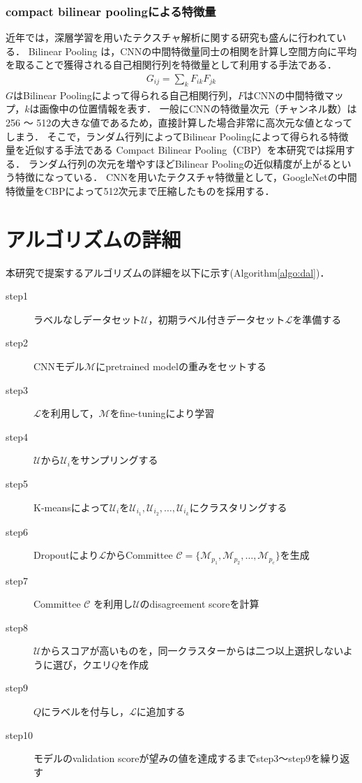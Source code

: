 \subsubsection{compact bilinear poolingによる特徴量}
近年では，深層学習を用いたテクスチャ解析に関する研究も盛んに行われている．
Bilinear Pooling \cite{lin2015bilinear}は，CNNの中間特徴量同士の相関を計算し空間方向に平均を取ることで獲得される自己相関行列を特徴量として利用する手法である．
\begin{eqnarray}
G_{ij} = \sum_k{F_{ik} F_{jk}}
\end{eqnarray}
$G$はBilinear Poolingによって得られる自己相関行列，$F$はCNNの中間特徴マップ，$k$は画像中の位置情報を表す．
一般にCNNの特徴量次元（チャンネル数）は256 〜 512の大きな値であるため，直接計算した場合非常に高次元な値となってしまう．
そこで，ランダム行列によってBilinear Poolingによって得られる特徴量を近似する手法である
Compact Bilinear Pooling（CBP）\cite{gao2016compact}を本研究では採用する．
ランダム行列の次元を増やすほどBilinear Poolingの近似精度が上がるという特徴になっている．
CNNを用いたテクスチャ特徴量として，GoogleNet\cite{szegedy2015going}の中間特徴量をCBPによって512次元まで圧縮したものを採用する．

\section{アルゴリズムの詳細}

本研究で提案するアルゴリズムの詳細を以下に示す(Algorithm\ref{algo:dal})．

\begin{description}
    \item[step1] ラベルなしデータセット$\mathcal{U}$，初期ラベル付きデータセット$\mathcal{L}$を準備する
    \item[step2] CNNモデル$\mathcal{M}$にpretrained modelの重みをセットする
    \item[step3] $\mathcal{L}$を利用して，$\mathcal{M}$をfine-tuningにより学習
    \item[step4] $\mathcal{U}$から$\mathcal{U}_i$をサンプリングする
    \item[step5] K-meansによって$\mathcal{U}_i$を$\mathcal{U}_{i_1}, \mathcal{U}_{i_2}, \dots, \mathcal{U}_{i_k}$にクラスタリングする
    \item[step6] Dropoutにより$\mathcal{L}$からCommittee $\mathcal{C} = \{\mathcal{M}_{p_1}, \mathcal{M}_{p_2}, \dots, \mathcal{M}_{p_c} \}$を生成
    \item[step7] Committee $\mathcal{C}$ を利用し$\mathcal{U}$のdisagreement scoreを計算
    \item[step8] $\mathcal{U}$からスコアが高いものを，同一クラスターからは二つ以上選択しないように選び，クエリ$Q$を作成
    \item[step9] $Q$にラベルを付与し，$\mathcal{L}$に追加する
    \item[step10] モデルのvalidation scoreが望みの値を達成するまでstep3〜step9を繰り返す
\end{description}


